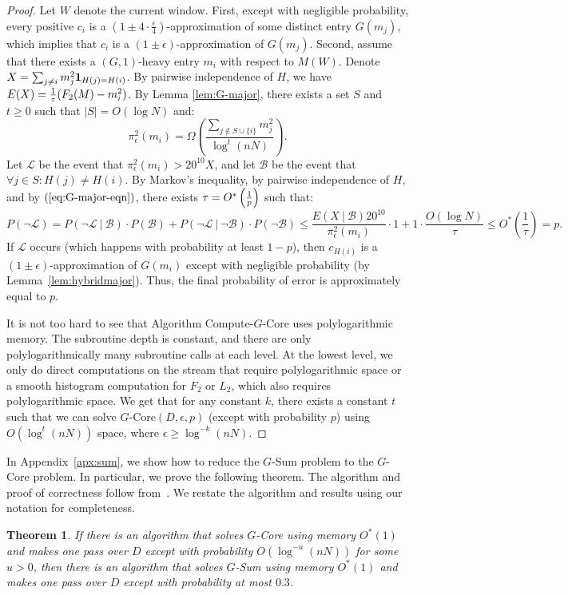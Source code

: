 \documentclass[11pt]{article}
\newtheorem{thm}{Theorem}
\newcommand{\one}{{\bf 1}}
\begin{document}
\begin{proof}
Let $W$ denote the current window.  First, except with negligible probability, every positive $c_i$ is a
$(1 \pm 4 \cdot \frac{\epsilon}{4})$-approximation of some distinct entry $G(m_{j})$, which implies that
$c_i$ is a $(1 \pm \epsilon)$-approximation of $G(m_j)$.  Second, assume that there exists a $(G,1)$-heavy
entry $m_i$ with respect to $M(W)$. Denote $X = \sum_{j \neq i} m_j^2 \one_{H(j) = H(i)}$. By pairwise independence of $H$, we have
$E(X) = {1\over \tau}(F_2(M) - m_i^2)$.  By Lemma \ref{lem:G-major}, there exists a set $S$ and $t \geq 0$ such that
$|S| = O(\log N)$ and:
\begin{equation}\label{eq:G-major-eqn}
\pi^2_{\epsilon}(m_i) = \Omega\left(\frac{\sum_{j\notin S\cup\{i\}} m_j^2}{\log^{t}(nN)}\right).
\end{equation}
Let $\mathcal{L}$ be the event that $\pi^2_{\epsilon}(m_i) > 20^{10} X$, and let $\mathcal{B}$ be the event that $\forall j \in S : H(j) \neq H(i)$.
By Markov's inequality, by pairwise independence of $H$, and by $(\ref{eq:G-major-eqn})$, there exists $\tau = O^*\left({1\over p}\right)$ such that:
$$
P(\neg\mathcal{L}) = P(\neg\mathcal{L} \ | \ \mathcal{B} ) \cdot P(\mathcal{B}) + P(\neg\mathcal{L} \ | \ \neg\mathcal{B}) \cdot P(\neg \mathcal{B}) \leq
\frac{E(X \ | \ \mathcal{B}) 20^{10}}{\pi^2_\epsilon(m_i)} \cdot 1 + 1 \cdot \frac{O(\log N)}{\tau} \leq O^*\left(\frac{1}{\tau}\right) = p.
$$
If $\mathcal{L}$ occurs (which happens with probability at least $1-p$), then $c_{H(i)}$ is a $(1 \pm \epsilon)$-approximation of $G(m_i)$
except with negligible probability (by Lemma~\ref{lem:hybridmajor}).  Thus, the final probability of error is approximately equal to $p$.

It is not too hard to see that Algorithm Compute-$G$-Core uses polylogarithmic memory.  The subroutine depth is constant, and there are only
polylogarithmically many subroutine calls at each level.  At the lowest level, we only do direct computations on the stream that require polylogarithmic
space or a smooth histogram computation for $F_2$ or $L_2$, which also requires polylogarithmic space.
We get that for any constant $k$, there exists a constant $t$ such that we can solve $G$-Core$(D, \epsilon,p)$ (except with probability $p$) using
$O(\log^t(nN))$ space, where $\epsilon\ge \log^{-k}(nN)$.
\end{proof}

In Appendix~\ref{apx:sum}, we show how to reduce the $G$-Sum problem to the $G$-Core problem.  In
particular, we prove the following theorem.  The algorithm and proof of correctness follow from~\cite{BO13}.
We restate the algorithm and results using our notation for completeness.
\begin{thm}\label{thm:gsum from gcore}
If there is an algorithm that solves $G$-Core using memory $O^*(1)$ and makes one pass over
$D$ except with probability $O(\log^{-u}(nN))$ for some $u>0$, then there is an algorithm that
solves $G$-Sum using memory $O^*(1)$ and makes one pass over $D$ except with probability at most $0.3$.
\end{thm}
\end{document}
